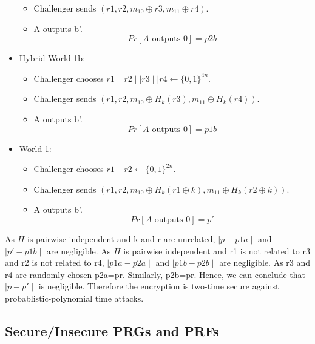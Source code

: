 \documentclass{article}
\begin{document}
\begin{itemize}
\begin{itemize}
            \item Challenger sends $(r1,r2,m_{10}\oplus r3,m_{11}\oplus r4)$.
            \item A outputs b'.
            \[Pr[A \text{ outputs }0]=p2b\]
        \end{itemize}
        \item Hybrid World 1b:
        \begin{itemize}
            \item Challenger chooses $r1 \mid \mid r2\mid \mid r3\mid \mid r4\leftarrow\{0,1\}^{4n}$.
            \item Challenger sends $(r1,r2,m_{10}\oplus H_{k}(r3),m_{11}\oplus H_{k}(r4))$.
            \item A outputs b'.
            \[Pr[A \text{ outputs }0]=p1b\]
        \end{itemize}
        \item World 1: 
        \begin{itemize}
            \item Challenger chooses $r1 \mid \mid r2\leftarrow\{0,1\}^{2n}$.
            \item Challenger sends $(r1,r2,m_{10}\oplus H_{k}(r1\oplus k),m_{11}\oplus H_{k}(r2\oplus k))$.
            \item A outputs b'.
            \[Pr[A \text{ outputs }0]=p'\]
        \end{itemize}
    \end{itemize}
As $H$ is pairwise independent and k and r are unrelated, $\mid p-p1a\mid$ and $\mid p'-p1b\mid$ are negligible. As $H$ is pairwise independent and r1 is not related to r3 and r2 is not related to r4, $\mid p1a-p2a\mid$ and $\mid p1b-p2b\mid$ are negligible. As r3 and r4 are randomly chosen p2a=pr. Similarly, p2b=pr.
Hence, we can conclude that $\mid p-p'\mid$ is negligible. Therefore the encryption is two-time secure against probablistic-polynomial time attacks.
\newpage
\subsection{Secure/Insecure PRGs and PRFs}
\end{document}
